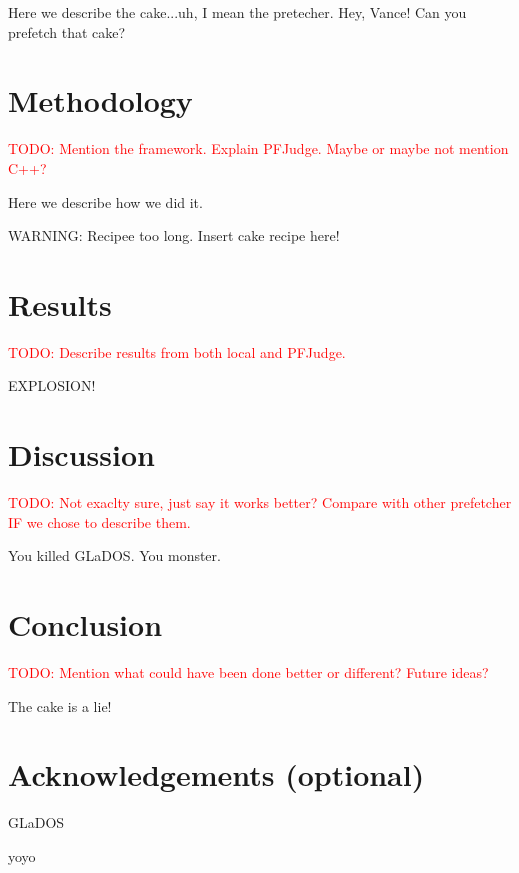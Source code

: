 \documentclass[a4paper]{IEEEtran}
\newcommand\TODO[1]{\textcolor{red}{TODO:#1}}
\newcommand\todo[1]{\TODO{#1}}
\begin{document}
Here we describe the cake...uh, I mean the pretecher. Hey, Vance! Can you prefetch that cake?
\section{Methodology}
\todo{ Mention the framework. Explain PFJudge. Maybe or maybe not mention C++?}
\break

Here we describe how we did it.

WARNING: Recipee too long. Insert cake recipe here!
\section{Results}
\todo{ Describe results from both local and PFJudge.}
\break

EXPLOSION!
\section{Discussion}
\todo{ Not exaclty sure, just say it works better? Compare with other prefetcher IF we chose to describe them. }
\break


You killed GLaDOS.
You monster.
\section{Conclusion}
\todo{ Mention what could have been done better or different? Future ideas? }
\break

The cake is a lie!
\section{Acknowledgements (optional)}
GLaDOS

yoyo \cite{assignment-text}



\nocite{*}
\end{document}
